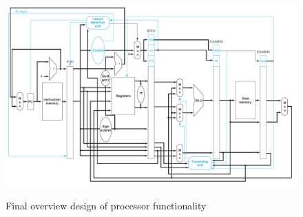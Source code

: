\begin{figure}[h]
	\centering
	\caption{Final overview design of processor functionality}
	\includegraphics[scale=0.75, angle=90]{figures/design2.png}
	\label{fig:final-2-2-landscape}
\end{figure}